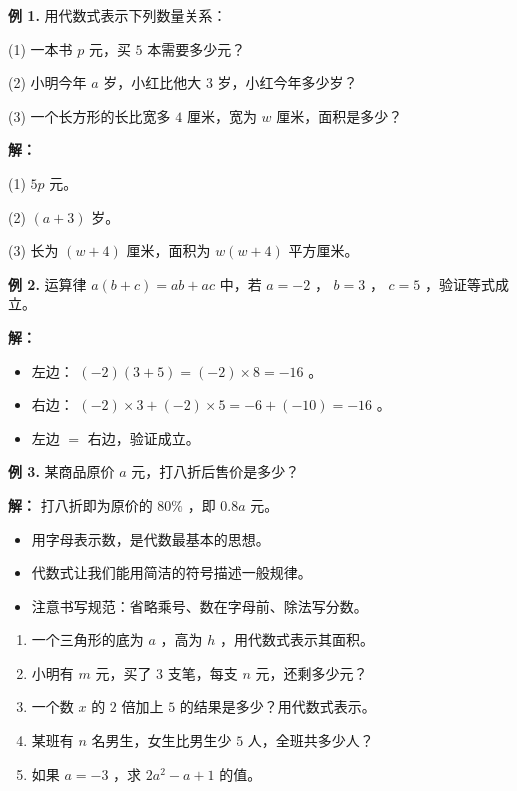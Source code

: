 \begin{workedexamples}


\textbf{例 1.} 用代数式表示下列数量关系：

(1) 一本书 $p$ 元，买 $5$ 本需要多少元？

(2) 小明今年 $a$ 岁，小红比他大 $3$ 岁，小红今年多少岁？

(3) 一个长方形的长比宽多 $4$ 厘米，宽为 $w$ 厘米，面积是多少？

\textbf{解：}

(1) $5p$ 元。

(2) $(a + 3)$ 岁。

(3) 长为 $(w + 4)$ 厘米，面积为 $w(w + 4)$ 平方厘米。

\textbf{例 2.} 运算律 $a(b + c) = ab + ac$ 中，若 $a = -2$ ， $b = 3$ ， $c = 5$ ，验证等式成立。

\textbf{解：}

\begin{itemize}
  \item 左边： $(-2)(3 + 5) = (-2) \times 8 = -16$ 。
  \item 右边： $(-2) \times 3 + (-2) \times 5 = -6 + (-10) = -16$ 。
  \item 左边 $=$ 右边，验证成立。
\end{itemize}


\textbf{例 3.} 某商品原价 $a$ 元，打八折后售价是多少？

\textbf{解：} 打八折即为原价的 $80\%$ ，即 $0.8a$ 元。

\end{workedexamples}

\begin{keytakeaway}


\begin{itemize}
  \item 用字母表示数，是代数最基本的思想。
  \item 代数式让我们能用简洁的符号描述一般规律。
  \item 注意书写规范：省略乘号、数在字母前、除法写分数。
\end{itemize}


\end{keytakeaway}

\begin{practice}


\begin{enumerate}
  \item 一个三角形的底为 $a$ ，高为 $h$ ，用代数式表示其面积。
  \item 小明有 $m$ 元，买了 $3$ 支笔，每支 $n$ 元，还剩多少元？
  \item 一个数 $x$ 的 $2$ 倍加上 $5$ 的结果是多少？用代数式表示。
  \item 某班有 $n$ 名男生，女生比男生少 $5$ 人，全班共多少人？
  \item 如果 $a = -3$ ，求 $2a^2 - a + 1$ 的值。
\end{enumerate}


\end{practice}


